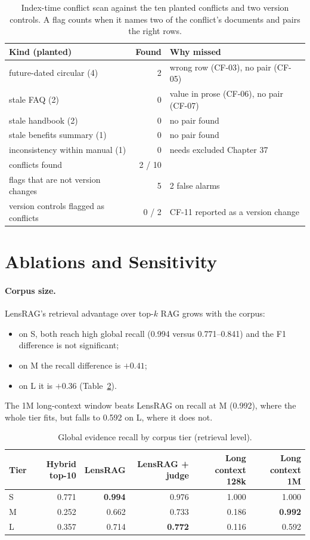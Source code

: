 \documentclass[11pt,letterpaper,oneside]{report}
\begin{document}
\begin{table}[htbp]
\centering\small
\caption{Index-time conflict scan against the ten planted conflicts and two
version controls. A flag counts when it names two of the conflict's
documents and pairs the right rows.}
\label{tab:conflict-scan}
\begin{tabular}{@{}lrl@{}}
\toprule
Kind (planted) & Found & Why missed \\
\midrule
future-dated circular (4) & 2 & wrong row (CF-03), no pair (CF-05) \\
stale FAQ (2) & 0 & value in prose (CF-06), no pair (CF-07) \\
stale handbook (2) & 0 & no pair found \\
stale benefits summary (1) & 0 & no pair found \\
inconsistency within manual (1) & 0 & needs excluded Chapter 37 \\
\midrule
conflicts found & 2 / 10 & \\
flags that are not version changes & 5 & 2 false alarms \\
version controls flagged as conflicts & 0 / 2 & CF-11 reported as a version change \\
\bottomrule
\end{tabular}
\end{table}

\section{Ablations and Sensitivity}
\label{sec:ablations}

\paragraph{Corpus size.}
LensRAG's retrieval advantage over top-$k$ RAG grows with the corpus:
\begin{itemize}
  \item on S, both reach high global recall (0.994 versus 0.771--0.841) and
  the F1 difference is not significant;
  \item on M the recall difference is $+0.41$;
  \item on L it is $+0.36$ (Table~\ref{tab:tiers}).
\end{itemize}
The 1M long-context window beats LensRAG on recall at M (0.992), where the
whole tier fits, but falls to 0.592 on L, where it does not.

\begin{table}[htbp]
\centering\small
\caption{Global evidence recall by corpus tier (retrieval level).}
\label{tab:tiers}
\begin{tabular}{@{}lrrrrr@{}}
\toprule
Tier & Hybrid top-10 & LensRAG & LensRAG + judge & Long context 128k & Long context 1M \\
\midrule
S & 0.771 & \textbf{0.994} & 0.976 & 1.000 & 1.000 \\
M & 0.252 & 0.662 & 0.733 & 0.186 & \textbf{0.992} \\
L & 0.357 & 0.714 & \textbf{0.772} & 0.116 & 0.592 \\
\bottomrule
\end{tabular}
\end{table}
\end{document}
